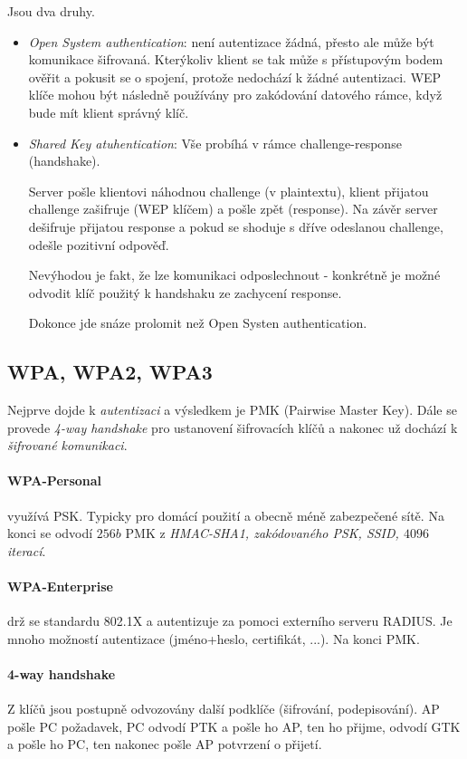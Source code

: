 \documentclass[10pt,a4paper]{article}
\begin{document}
Jsou dva druhy. 
\begin{itemize}
	\item \textit{Open System authentication}: není autentizace žádná, přesto ale může být komunikace šifrovaná.
	Kterýkoliv klient se tak může s přístupovým bodem ověřit a pokusit se o spojení, protože nedochází k žádné autentizaci. 
	WEP klíče mohou být následně používány pro zakódování datového rámce, když bude mít klient správný klíč.
	\item \textit{Shared Key atuhentication}:  Vše probíhá v rámce challenge-response (handshake).
	
	Server pošle klientovi náhodnou challenge (v plaintextu), 
	klient přijatou challenge zašifruje (WEP klíčem) a pošle zpět (response).
	Na závěr server dešifruje přijatou response a pokud se shoduje s dříve odeslanou challenge, odešle pozitivní odpověď.
	
	Nevýhodou je fakt, že lze komunikaci odposlechnout - konkrétně je možné odvodit klíč použitý k handshaku ze zachycení response.  
	
	Dokonce jde snáze prolomit než Open Systen authentication.
\end{itemize}

\subsection{WPA, WPA2, WPA3}

Nejprve dojde k \textit{autentizaci} a výsledkem je PMK (Pairwise Master Key). Dále se provede \textit{4-way handshake} pro ustanovení šifrovacích klíčů a nakonec už dochází k \textit{šifrované komunikaci}.

\paragraph{WPA-Personal} využívá PSK. Typicky pro domácí použití a obecně méně zabezpečené sítě. Na konci se odvodí $ 256b $ PMK z \textit{HMAC-SHA1, zakódovaného PSK, SSID, $ 4096 $ iterací}.
\paragraph{WPA-Enterprise} drž se standardu 802.1X a autentizuje za pomoci externího serveru RADIUS. 
Je mnoho možností autentizace (jméno+heslo, certifikát, ...). Na konci PMK.
\paragraph{4-way handshake} Z klíčů jsou postupně odvozovány další podklíče (šifrování, podepisování).
AP pošle PC požadavek, PC odvodí PTK a pošle ho AP, ten ho přijme, odvodí GTK a pošle ho PC, ten nakonec pošle AP potvrzení o přijetí.
\end{document}

